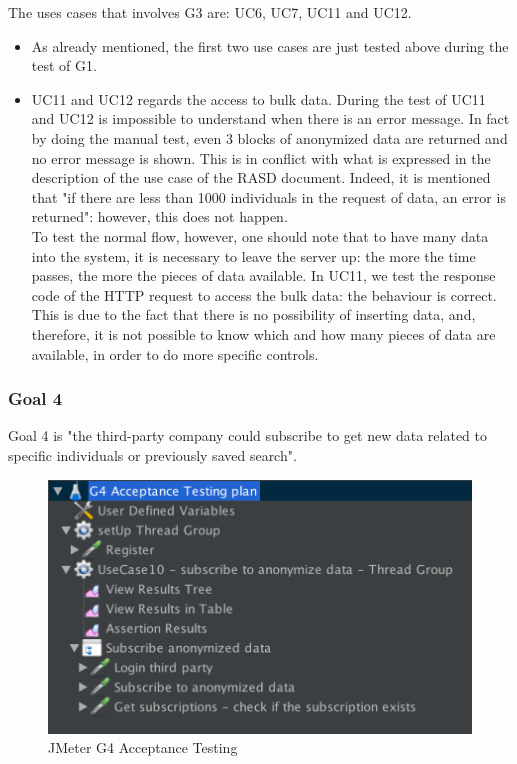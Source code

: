 The uses cases that involves G3 are: UC6, UC7, UC11 and UC12.  

\begin{itemize}
\item 
As already mentioned, the first two use cases are just tested above during the test of G1.

\item 
UC11 and UC12 regards the access to bulk data.
During the test of UC11 and UC12 is impossible to understand when there is an error message. 
In fact by doing the manual test, even 3 blocks of anonymized data are returned and no error message is shown. 
This is in conflict with what is expressed in the description of the use case of the RASD document. 
Indeed, it is mentioned that "if there are less than 1000 individuals in the request of data, an error is returned":
however, this does not happen. \\
To test the normal flow, however, one should note that to have many data into the system, it is necessary to leave the server up: the more the
time passes, the more the pieces of data available. In UC11, we test the response code of the HTTP request to access the bulk data: the
behaviour is correct. This is due to the fact that there is no possibility of inserting data, and, therefore, it is not possible to know which
and how many pieces of data are available, in order to do more specific controls. 

\end{itemize}

\subsubsection{Goal 4}
Goal 4 is "the third-party company could subscribe to get new data related to specific
individuals or previously saved search".

\begin{figure}[H]
\includegraphics[width=0.7\linewidth]{images/goal4}
\centering
\caption{ JMeter G4 Acceptance Testing }
\label{fig:goal4}
\end{figure}

